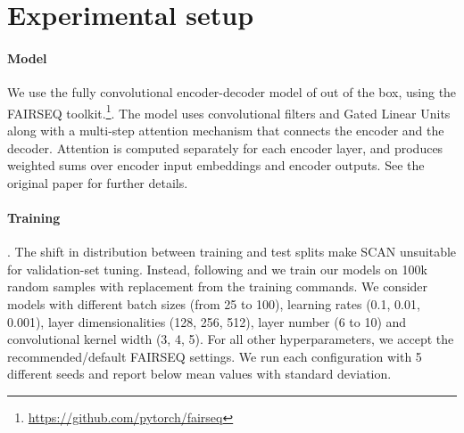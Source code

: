 \section{Experimental setup}
\paragraph{Model} We use the fully convolutional encoder-decoder model
of  out of the box, using the FAIRSEQ
toolkit.\footnote{\url{https://github.com/pytorch/fairseq}}. The model
uses convolutional filters and Gated Linear Units
\cite{dauphin:etal:2016} along with a multi-step attention mechanism
that connects the encoder and the decoder.  Attention is computed
separately for each encoder layer, and produces weighted sums over
encoder input embeddings and encoder outputs. See the original paper
for further details.

\paragraph{Training}. The shift in distribution between training and
test splits make SCAN unsuitable for validation-set tuning. Instead,
following  and  we
train our models on 100k random samples with replacement from the
training commands. We consider models with different batch sizes (from
25 to 100), learning rates (0.1, 0.01, 0.001), layer dimensionalities
(128, 256, 512), layer number (6 to 10) and convolutional kernel width
(3, 4, 5). For all other hyperparameters, we accept the
recommended/default FAIRSEQ settings. We run each configuration with
5 different seeds and report below mean values with standard
deviation.




